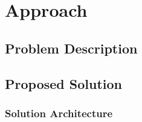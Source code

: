 \section{Approach} \label{Sec:Approach} 
\subsection{Problem Description}
\subsection{Proposed Solution}
\subsubsection{Solution Architecture}
